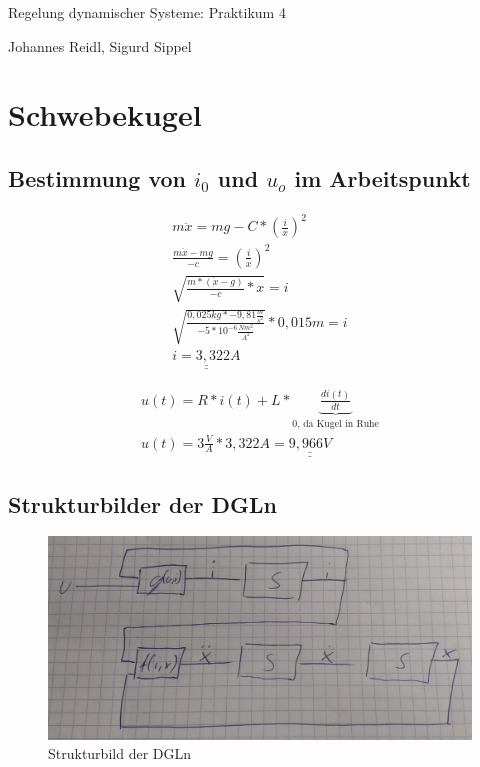 \documentclass[10pt,a4paper]{article}
\begin{document}
\begin{center}
Regelung dynamischer Systeme: Praktikum 4

Johannes Reidl, Sigurd Sippel
\end{center}

\section{Schwebekugel}
\subsection{Bestimmung von $i_0$ und  $u_o$ im Arbeitspunkt}
\begin{figure}[H]
  \begin{align}
	  m\ddot{x} = mg - C * (\frac{i}{x})^2 \nonumber \\
	  \frac{m\ddot{x} - mg}{-c} = (\frac{i}{x})^2 \nonumber \\
	  \sqrt{\frac{m* (\ddot{x} - g)}{-c} * x} = i \nonumber \\
	  \sqrt{\frac{0,025kg * -9,81\frac{m}{s^2}}{-5 * 10^{-6}\frac{Nm^2}{A^2}}} * 0,015m = i \nonumber \\
	  \underline{\underline{i = 3,322A}} \nonumber
  \end{align}
\end{figure}

\begin{figure}[H]
  \begin{align}
	  u(t) = R * i(t) + L * \underbrace{\frac{di(t)}{dt}}_\text{0, da Kugel in Ruhe} \nonumber \\
	  u(t) = 3\frac{V}{A} * 3,322A = \underline{\underline{9,966V}} \nonumber
  \end{align}
\end{figure}

\subsection{Strukturbilder der DGLn}
\begin{figure}[H]
	\centering
	\includegraphics[width=1\textwidth]{screens/schaltbild.jpg}
	\caption{Strukturbild der DGLn}
\end{figure}
\end{document}
